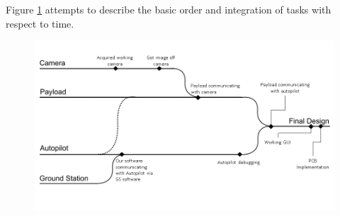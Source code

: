Figure \ref{fig:streams} attempts to describe the basic order and integration of tasks with respect to time.

\begin{figure}[H]
        \centering
        \includegraphics[width=1.0\textwidth]{figures/streams.png}
        \label{fig:streams}
\end{figure}